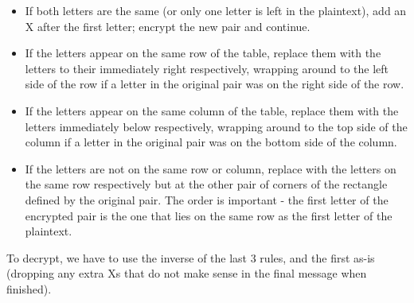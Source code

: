 \documentclass[Lau,binding=0.6cm,oneside]{sapthesis}
\begin{document}
\begin{itemize}
	\item If both letters are the same (or only one letter is left in the plaintext), add an \textsf{X} after the first letter; encrypt the new pair and continue.
	\item If the letters appear on the same row of the table, replace them with the letters to their immediately right respectively, wrapping around to the left side of the row if a letter in the original pair was on the right side of the row.
	\item If the letters appear on the same column of the table, replace them with the letters immediately below respectively, wrapping around to the top side of the column if a letter in the original pair was on the bottom side of the column.
	\item If the letters are not on the same row or column, replace with the letters on the same row respectively but at the other pair of corners of the rectangle defined by the original pair. The order is important - the first letter of the encrypted pair is the one that lies on the same row as the first letter of the plaintext.
\end{itemize}

To decrypt, we have to use the inverse of the last 3 rules, and the first as-is (dropping any extra \textsf{X}s that do not make sense in the final message when finished).\\\\
\end{document}

